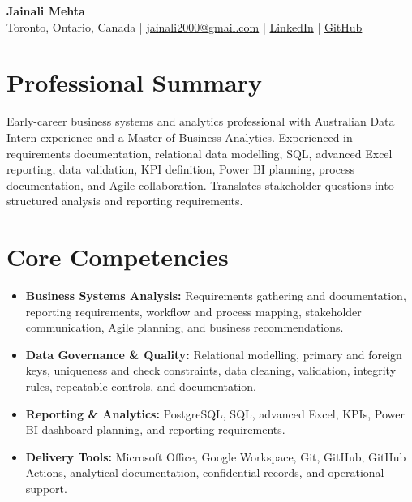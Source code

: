 \documentclass[letterpaper,10pt]{article}
\begin{document}
\begin{center}
  {\fontsize{17}{19}\selectfont\textbf{Jainali Mehta}}\\[2pt]
  \small Toronto, Ontario, Canada \;|\;
  \href{mailto:jainali2000@gmail.com}{jainali2000@gmail.com} \;|\;
  \href{https://www.linkedin.com/in/jainali-mehta}{LinkedIn} \;|\;
  \href{https://github.com/jainalimehta}{GitHub}
\end{center}
\vspace{-7pt}

\section{Professional Summary}
\small Early-career business systems and analytics professional with Australian Data Intern experience and a Master of Business Analytics. Experienced in requirements documentation, relational data modelling, SQL, advanced Excel reporting, data validation, KPI definition, Power BI planning, process documentation, and Agile collaboration. Translates stakeholder questions into structured analysis and reporting requirements.

\section{Core Competencies}
\begin{itemize}[leftmargin=0.16in,label=\textbullet,topsep=0pt,itemsep=1pt,parsep=0pt]
  \item \small \textbf{Business Systems Analysis:} Requirements gathering and documentation, reporting requirements, workflow and process mapping, stakeholder communication, Agile planning, and business recommendations.
  \item \small \textbf{Data Governance \& Quality:} Relational modelling, primary and foreign keys, uniqueness and check constraints, data cleaning, validation, integrity rules, repeatable controls, and documentation.
  \item \small \textbf{Reporting \& Analytics:} PostgreSQL, SQL, advanced Excel, KPIs, Power BI dashboard planning, and reporting requirements.
  \item \small \textbf{Delivery Tools:} Microsoft Office, Google Workspace, Git, GitHub, GitHub Actions, analytical documentation, confidential records, and operational support.
\end{itemize}
\end{document}
